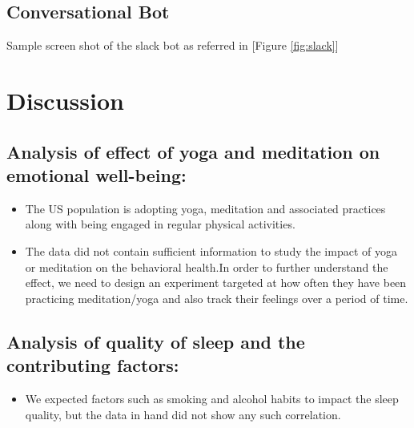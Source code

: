 \documentclass[12pt]{article}
\begin{document}
\subsection{Conversational Bot}

Sample screen shot of the slack bot as referred in [Figure \ref{fig:slack}]

\section{Discussion}
\subsection{Analysis of effect of yoga and meditation on emotional well-being:}
\begin{itemize}
    \item The US population is adopting yoga, meditation and associated practices along with being engaged in regular physical activities.
    \item The data did not contain sufficient information to study the impact of yoga or meditation on the behavioral health.In order to further understand the effect, we need to design an experiment targeted at how often they have been practicing meditation/yoga and also track their feelings over a period of time.
    \end{itemize}
     \subsection{Analysis of quality of sleep and the contributing factors:}
    \begin{itemize}
   \item We expected factors such as smoking and alcohol habits to impact the sleep quality, but the data in hand did not show any such correlation. 
   \end{itemize}
\end{document}
